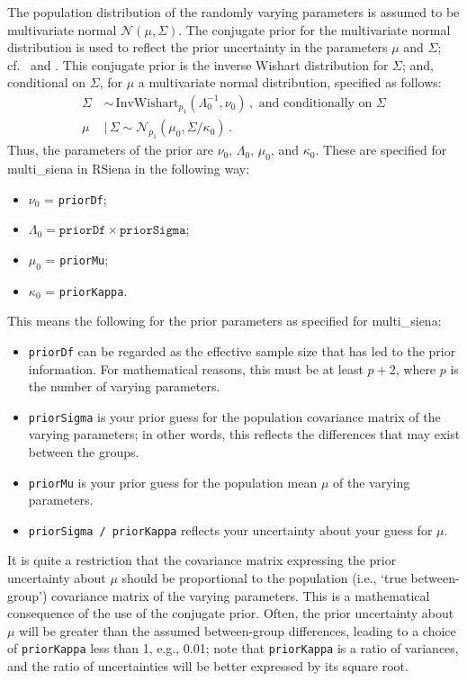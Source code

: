 \documentclass[a4paper,fleqn,11pt]{article}
\newcommand{\+}{\, + \,}
\newcommand{\RS}{{\sf \textsf{RSiena} }}
\begin{document}
\noindent
The population distribution of the randomly varying parameters
is assumed to be multivariate normal $\mathcal{N}(\mu, \Sigma)$.
The conjugate prior for the multivariate normal distribution is used
to reflect the prior uncertainty in the parameters $\mu$ and $\Sigma$;
cf.\ \citet[][Section 3.6]{BDA3} and \citet[][Chapter 14]{HaganForster2004}.
This conjugate prior is the inverse Wishart distribution for $\Sigma$;
and, conditional on $\Sigma$, for $\mu$ a multivariate normal distribution,
specified as follows:
\begin{subequations}
\begin{align}
  \Sigma \, & \sim \,
    \mathrm{InvWishart}_{{p_1}}(\Lambda_0^{-1},\nu_0) \, ,
    \text{ and conditionally on }  \Sigma \\
   \mu \, & \mid \, \Sigma \sim \mathcal{N}_{p_1}(\mu_0, \Sigma/\kappa_0) \, .
\end{align}
\end{subequations}
Thus, the parameters of the prior are $\nu_0$, $\Lambda_0$, $\mu_0$,
and $\kappa_0$.
These are specified for \textsf{multi\_siena} in \RS in the following way:
\begin{itemize}
  \item $\nu_0$ = \texttt{priorDf};
  \item  $\Lambda_0 = \mathtt{priorDf} \times \mathtt{priorSigma}$;
  \item  $\mu_0$ = \texttt{priorMu};
  \item $\kappa_0$ = \texttt{priorKappa}.
\end{itemize}
This means the following for the prior parameters as
specified for \textsf{multi\_siena}:
\begin{itemize}
  \item  \texttt{priorDf} can be regarded as the
        effective sample size that has led to the prior information.
        For mathematical reasons, this must be at least $p+2$, where
        $p$ is the number of varying parameters.
  \item  \texttt{priorSigma} is your prior guess for the population
        covariance matrix of the varying parameters; in other words,
        this reflects the differences that may exist between the groups.
  \item  \texttt{priorMu} is your prior guess for the population mean $\mu$ of
       the varying parameters.
  \item \texttt{priorSigma / priorKappa} reflects your uncertainty
       about your guess for $\mu$.
\end{itemize}
It is quite a restriction that the covariance matrix expressing the prior
uncertainty about $\mu$ should be proportional to the population
(i.e., `true between-group') covariance matrix of the varying parameters.
This is a mathematical consequence of the use of the conjugate prior.
Often, the prior uncertainty about $\mu$ will be greater than the
assumed between-group differences, leading to a choice of \texttt{priorKappa}
less than 1, e.g., 0.01; note that \texttt{priorKappa} is a ratio
of variances, and the ratio of uncertainties will be better
expressed by its square root.
\end{document}
